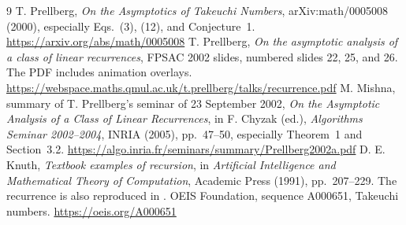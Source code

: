 \documentclass[11pt,letterpaper]{article}
\theoremstyle{remark}\newtheorem{remark}[theorem]{Remark}
\begin{document}
\begin{thebibliography}{9}
\small
{}
T. Prellberg, \emph{On the Asymptotics of Takeuchi Numbers}, arXiv:math/0005008 (2000), especially Eqs.~(3), (12), and Conjecture~1.\newline
\url{https://arxiv.org/abs/math/0005008}
T. Prellberg, \emph{On the asymptotic analysis of a class of linear recurrences}, FPSAC 2002 slides, numbered slides 22, 25, and 26. The PDF includes animation overlays.\newline
\url{https://webspace.maths.qmul.ac.uk/t.prellberg/talks/recurrence.pdf}
M. Mishna, summary of T. Prellberg's seminar of 23 September 2002, \emph{On the Asymptotic Analysis of a Class of Linear Recurrences}, in F. Chyzak (ed.), \emph{Algorithms Seminar 2002--2004}, INRIA (2005), pp.~47--50, especially Theorem~1 and Section~3.2.\newline
\url{https://algo.inria.fr/seminars/summary/Prellberg2002a.pdf}
D. E. Knuth, \emph{Textbook examples of recursion}, in \emph{Artificial Intelligence and Mathematical Theory of Computation}, Academic Press (1991), pp.~207--229. The recurrence is also reproduced in \cite{prellberg2000,mishna2005}.
OEIS Foundation, sequence A000651, Takeuchi numbers.\newline
\url{https://oeis.org/A000651}
\end{thebibliography}
\end{document}
